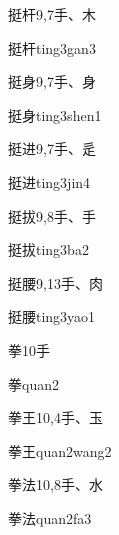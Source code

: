 \begin{entry}{挺杆}{9,7}{⼿、⽊}
  \begin{phonetics}{挺杆}{ting3gan3}
  \end{phonetics}
\end{entry}

\begin{entry}{挺身}{9,7}{⼿、⾝}
  \begin{phonetics}{挺身}{ting3shen1}
  \end{phonetics}
\end{entry}

\begin{entry}{挺进}{9,7}{⼿、⾡}
  \begin{phonetics}{挺进}{ting3jin4}
  \end{phonetics}
\end{entry}

\begin{entry}{挺拔}{9,8}{⼿、⼿}
  \begin{phonetics}{挺拔}{ting3ba2}
  \end{phonetics}
\end{entry}

\begin{entry}{挺腰}{9,13}{⼿、⾁}
  \begin{phonetics}{挺腰}{ting3yao1}
  \end{phonetics}
\end{entry}

\begin{entry}{拳}{10}{⼿}
  \begin{phonetics}{拳}{quan2}
  \end{phonetics}
\end{entry}

\begin{entry}{拳王}{10,4}{⼿、⽟}
  \begin{phonetics}{拳王}{quan2wang2}
  \end{phonetics}
\end{entry}

\begin{entry}{拳法}{10,8}{⼿、⽔}
  \begin{phonetics}{拳法}{quan2fa3}
  \end{phonetics}
\end{entry}

